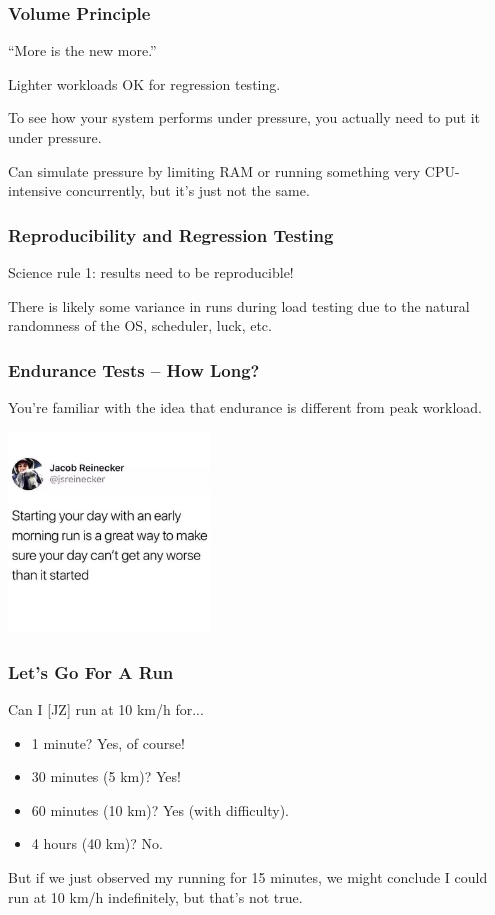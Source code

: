\begin{frame}
\frametitle{Volume Principle}


``More is the new more.'' 

Lighter workloads OK for regression testing. 

To see how your system performs under pressure, you actually need to put it under pressure. 

Can simulate pressure by limiting RAM or running something very CPU-intensive concurrently, but it's just not the same.

\end{frame}



\begin{frame}
\frametitle{Reproducibility and Regression Testing}

Science rule 1: results need to be reproducible!


There is likely some variance in runs during load testing due to the natural randomness of the OS, scheduler, luck, etc.


\end{frame}


\begin{frame}
\frametitle{Endurance Tests -- How Long?}

You're familiar with the idea that endurance is different from peak workload.

\begin{center}
  \includegraphics[width=0.4\textwidth]{images/running-worse.jpg}
\end{center}

\end{frame}

\begin{frame}
\frametitle{Let's Go For A Run}

Can I [JZ] run at 10 km/h for...\\
\begin{itemize}
	\item 1 minute? Yes, of course!
	\item 30 minutes (5 km)? Yes!
	\item 60 minutes (10 km)? Yes (with difficulty).
	\item 4 hours (40 km)? No.
\end{itemize}

But if we just observed my running for 15 minutes, we might conclude I could run at 10 km/h indefinitely, but that's not true.

\end{frame}

